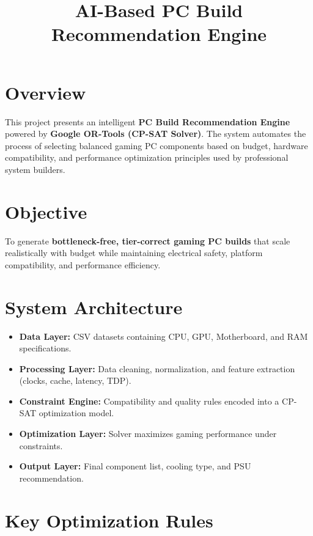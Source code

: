 \documentclass[11pt,a4paper]{article}
\title{\textbf{AI-Based PC Build Recommendation Engine}}
\author{}
\date{}
\begin{document}
\maketitle

\section*{Overview}

This project presents an intelligent \textbf{PC Build Recommendation Engine} powered by \textbf{Google OR-Tools (CP-SAT Solver)}. The system automates the process of selecting balanced gaming PC components based on budget, hardware compatibility, and performance optimization principles used by professional system builders.

\section*{Objective}

To generate \textbf{bottleneck-free, tier-correct gaming PC builds} that scale realistically with budget while maintaining electrical safety, platform compatibility, and performance efficiency.

\section*{System Architecture}

\begin{itemize}[noitemsep]
    \item \textbf{Data Layer:} CSV datasets containing CPU, GPU, Motherboard, and RAM specifications.
    \item \textbf{Processing Layer:} Data cleaning, normalization, and feature extraction (clocks, cache, latency, TDP).
    \item \textbf{Constraint Engine:} Compatibility and quality rules encoded into a CP-SAT optimization model.
    \item \textbf{Optimization Layer:} Solver maximizes gaming performance under constraints.
    \item \textbf{Output Layer:} Final component list, cooling type, and PSU recommendation.
\end{itemize}

\section*{Key Optimization Rules}
\end{document}
